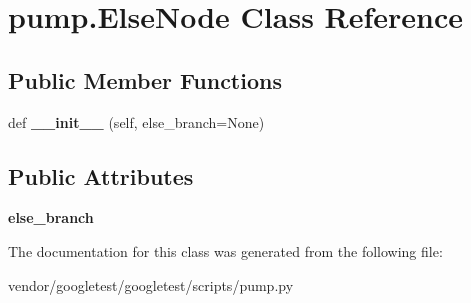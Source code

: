 \hypertarget{classpump_1_1ElseNode}{}\section{pump.\+Else\+Node Class Reference}
\label{classpump_1_1ElseNode}
\subsection*{Public Member Functions}
\begin{DoxyCompactItemize}
\item 
def {\bfseries \+\_\+\+\_\+init\+\_\+\+\_\+} (self, else\+\_\+branch=None)\hypertarget{classpump_1_1ElseNode_a7489ff8c6c7ddfe6bd6593b8ecccd819}{}\label{classpump_1_1ElseNode_a7489ff8c6c7ddfe6bd6593b8ecccd819}

\end{DoxyCompactItemize}
\subsection*{Public Attributes}
\begin{DoxyCompactItemize}
\item 
{\bfseries else\+\_\+branch}\hypertarget{classpump_1_1ElseNode_ac838a0fe9f5d713c7f56939eed5e128d}{}\label{classpump_1_1ElseNode_ac838a0fe9f5d713c7f56939eed5e128d}

\end{DoxyCompactItemize}


The documentation for this class was generated from the following file\+:\begin{DoxyCompactItemize}
\item 
vendor/googletest/googletest/scripts/pump.\+py\end{DoxyCompactItemize}
